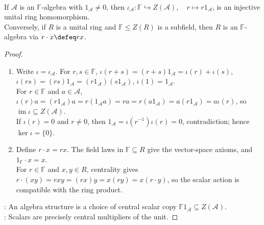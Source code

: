 \begin{proposition} \label{prop:field-embeds-in-center-of-algebra} \\
If $\mathcal{A}$ is an $\mathbb{F}$-algebra with $1_{\mathcal{A}}\neq0$, then $\iota_{\mathcal{A}}:\mathbb{F}\hookrightarrow Z(\mathcal{A}),\quad r\mapsto r1_{\mathcal{A}}$, is an injective unital ring homomorphism.\\
Conversely, if $R$ is a unital ring and $\mathbb{F}\leq Z(R)$ is a subfield, then $R$ is an $\mathbb{F}$-algebra via $r\cdot x\defeq rx$.
\begin{proof}
\begin{enumerate}[label=\roman*.]
\setlength{\itemsep}{0pt}
\item[$(\Rightarrow)$] Write $\iota=\iota_{\mathcal{A}}$. For $r,s\in\mathbb{F}$, $\iota(r+s)=(r+s)1_{\mathcal{A}}=\iota(r)+\iota(s)$, $\iota(rs)=(rs)1_{\mathcal{A}}=(r1_{\mathcal{A}})(s1_{\mathcal{A}})$, $\iota(1)=1_{\mathcal{A}}$.\\
For $r\in\mathbb{F}$ and $a\in\mathcal{A}$, $\iota(r)a=(r1_{\mathcal{A}})a=r(1_{\mathcal{A}}a)=ra=r(a1_{\mathcal{A}})=a(r1_{\mathcal{A}})=a\iota(r)$, so $\operatorname{im}\iota\subseteq Z(\mathcal{A})$.\\
If $\iota(r)=0$ and $r\neq0$, then $1_{\mathcal{A}}=\iota(r^{-1})\iota(r)=0$, contradiction; hence $\ker\iota=\{0\}$.
\item[$(\Leftarrow)$] Define $r\cdot x=rx$. The field laws in $\mathbb{F}\subseteq R$ give the vector-space axioms, and $1_{\mathbb{F}}\cdot x=x$.\\
For $r\in\mathbb{F}$ and $x,y\in R$, centrality gives $r\cdot(xy)=rxy=(rx)y=x(ry)=x(r\cdot y)$, so the scalar action is compatible with the ring product.
\end{enumerate}
: An algebra structure is a choice of central scalar copy $\mathbb{F}1_{\mathcal{A}}\subseteq Z(\mathcal{A})$.\\
: Scalars are precisely central multipliers of the unit.
\end{proof}
\end{proposition}


